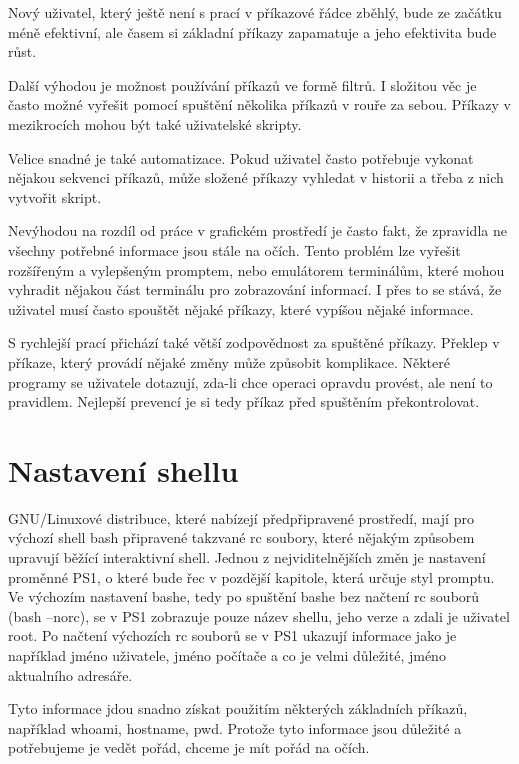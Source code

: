\documentclass[thesis=M,czech]{FITthesis}[2012/06/26]
\begin{document}
Nový uživatel, který ještě není s prací v příkazové řádce zběhlý, bude ze začátku méně efektivní, ale časem si základní příkazy zapamatuje a jeho efektivita bude růst.

Další výhodou je možnost používání příkazů ve formě filtrů. I složitou věc je často možné vyřešit pomocí spuštění několika příkazů v rouře za sebou. Příkazy v mezikrocích mohou být také uživatelské skripty.

Velice snadné je také automatizace. Pokud uživatel často potřebuje vykonat nějakou sekvenci příkazů, může složené příkazy vyhledat v historii a třeba z nich vytvořit skript.

Nevýhodou na rozdíl od práce v grafickém prostředí je často fakt, že zpravidla ne všechny potřebné informace jsou stále na očích. Tento problém lze vyřešit rozšířeným a vylepšeným promptem, nebo emulátorem terminálům, které mohou vyhradit nějakou část terminálu pro zobrazování informací. I přes to se stává, že uživatel musí často spouštět nějaké příkazy, které vypíšou nějaké informace.

S rychlejší prací přichází také větší zodpovědnost za spuštěné příkazy. Překlep v příkaze, který provádí nějaké změny může způsobit komplikace. Některé programy se uživatele dotazují, zda-li chce operaci opravdu provést, ale není to pravidlem. Nejlepší prevencí je si tedy příkaz před spuštěním překontrolovat.


%
%
%
\section{Nastavení shellu}

GNU/Linuxové distribuce, které nabízejí předpřipravené prostředí, mají pro výchozí shell bash připravené takzvané rc soubory, které nějakým způsobem upravují běžící interaktivní shell. Jednou z nejviditelnějších změn je nastavení proměnné PS1, o které bude řec v pozdější kapitole, která určuje styl promptu. Ve výchozím nastavení bashe, tedy po spuštění bashe bez načtení rc souborů (bash --norc), se v PS1 zobrazuje pouze název shellu, jeho verze a zdali je uživatel root. Po načtení výchozích rc souborů se v PS1 ukazují informace jako je například jméno uživatele, jméno počítače a co je velmi důležité, jméno aktualního adresáře.

Tyto informace jdou snadno získat použitím některých základních příkazů, například whoami, hostname, pwd. Protože tyto informace jsou důležité a potřebujeme je vedět pořád, chceme je mít pořád na očích.
\end{document}
